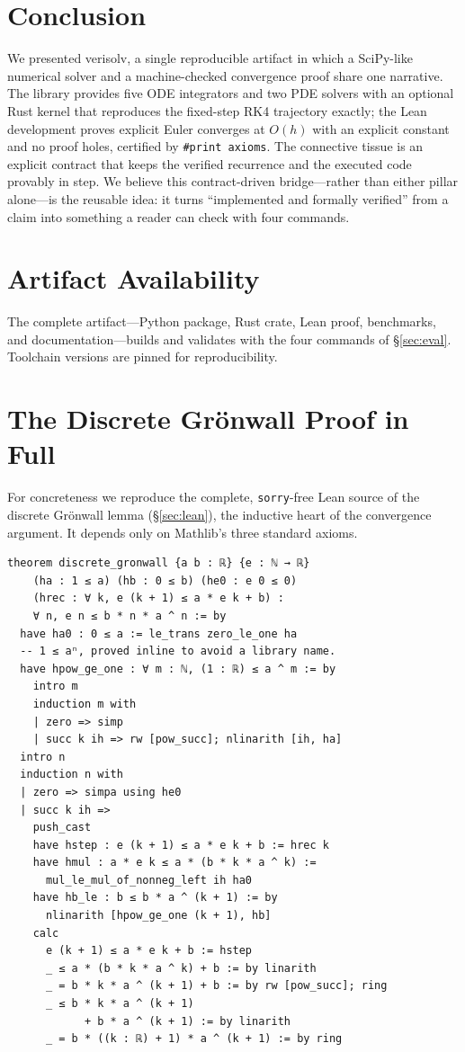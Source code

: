 \documentclass[sigplan,nonacm,screen]{acmart}
\begin{document}
\section{Conclusion}
\label{sec:conclusion}

We presented verisolv, a single reproducible artifact in which a SciPy-like
numerical solver and a machine-checked convergence proof share one narrative. The
library provides five ODE integrators and two PDE solvers with an optional Rust
kernel that reproduces the fixed-step RK4 trajectory exactly; the Lean development
proves explicit Euler converges at $O(h)$ with an explicit constant and no proof
holes, certified by \texttt{\#print axioms}. The connective tissue is an explicit
contract that keeps the verified recurrence and the executed code provably in
step. We believe this contract-driven bridge---rather than either pillar
alone---is the reusable idea: it turns ``implemented and formally verified'' from
a claim into something a reader can check with four commands.

\section*{Artifact Availability}
The complete artifact---Python package, Rust crate, Lean proof, benchmarks, and
documentation---builds and validates with the four commands of
\S\ref{sec:eval}. Toolchain versions are pinned for reproducibility.




\appendix
\section{The Discrete Grönwall Proof in Full}
\label{app:gronwall}
For concreteness we reproduce the complete, \texttt{sorry}-free Lean source of the
discrete Grönwall lemma (\S\ref{sec:lean}), the inductive heart of the convergence
argument. It depends only on Mathlib's three standard axioms.

\begin{lstlisting}[language=lean]
theorem discrete_gronwall {a b : ℝ} {e : ℕ → ℝ}
    (ha : 1 ≤ a) (hb : 0 ≤ b) (he0 : e 0 ≤ 0)
    (hrec : ∀ k, e (k + 1) ≤ a * e k + b) :
    ∀ n, e n ≤ b * n * a ^ n := by
  have ha0 : 0 ≤ a := le_trans zero_le_one ha
  -- 1 ≤ aⁿ, proved inline to avoid a library name.
  have hpow_ge_one : ∀ m : ℕ, (1 : ℝ) ≤ a ^ m := by
    intro m
    induction m with
    | zero => simp
    | succ k ih => rw [pow_succ]; nlinarith [ih, ha]
  intro n
  induction n with
  | zero => simpa using he0
  | succ k ih =>
    push_cast
    have hstep : e (k + 1) ≤ a * e k + b := hrec k
    have hmul : a * e k ≤ a * (b * k * a ^ k) :=
      mul_le_mul_of_nonneg_left ih ha0
    have hb_le : b ≤ b * a ^ (k + 1) := by
      nlinarith [hpow_ge_one (k + 1), hb]
    calc
      e (k + 1) ≤ a * e k + b := hstep
      _ ≤ a * (b * k * a ^ k) + b := by linarith
      _ = b * k * a ^ (k + 1) + b := by rw [pow_succ]; ring
      _ ≤ b * k * a ^ (k + 1)
            + b * a ^ (k + 1) := by linarith
      _ = b * ((k : ℝ) + 1) * a ^ (k + 1) := by ring
\end{lstlisting}
\end{document}
